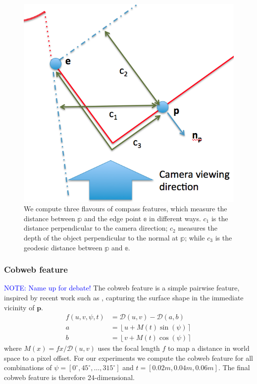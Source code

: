 \documentclass[10pt,twocolumn,letterpaper]{article}
\newcommand{\degree}{^{\circ}}
\newcommand{\rgbdimage}{\mathcal{D}}
\newcommand{\point}{\mathbf{p}}
\newcommand{\note}[1]{\textcolor{blue}{NOTE: #1}}
\begin{document}
\begin{figure}
    \centering 
    \includegraphics[width=1.0\columnwidth]{compass_features}
    \caption{We compute three flavours of compass features, which measure the distance between $\mathbb{p}$ and the edge point $\mathbb{e}$ in different ways. $c_1$ is the distance perpendicular to the camera direction; $c_2$ measures the depth of the object perpendicular to the normal at $\mathbb{p}$; while $c_3$ is the geodesic distance between $\mathbb{p}$ and $\mathbb{e}$.}
    \label{fig:compass_features}
\end{figure}


\subsubsection{Cobweb feature }
\note{Name up for debate!}
The cobweb feature is a simple pairwise feature, inspired by recent work such as \cite{shotton-cvpr-2011}, capturing the surface shape in the immediate vicinity of $\point$.
\begin{align}
f(u, v, \psi, t) &= \rgbdimage(u, v) - \rgbdimage(a, b) \\
a &= \left\lfloor u + M(t)  \sin(\psi) \right\rceil \\
b &= \left\lfloor v + M(t)  \cos(\psi) \right\rceil
\end{align}
where $M(x) = fx / \rgbdimage(u, v)$ uses the focal length $f$ to map a distance in world space to a pixel offset. For our experiments we compute the cobweb feature for all combinations of $\psi = [0\degree, 45\degree, \ldots, 315\degree]$ and $t = [0.02m, 0.04m, 0.06m]$.
The final cobweb feature is therefore 24-dimensional.
\end{document}

